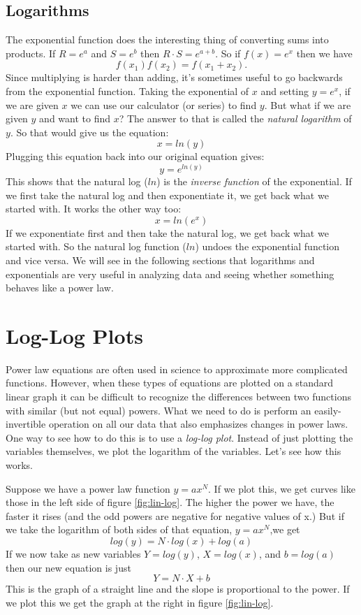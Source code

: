 \subsection*{Logarithms}
The exponential function does the interesting thing of converting sums into products.
If $R = e^{a}$ and $S = e^{b}$ then $R \cdot S = e^{a+b}$.
So if $f(x) = e^{x}$ then we have
\[ f(x_{1})f(x_{2}) = f(x_{1} + x_{2}). \]
Since multiplying is harder than adding, it's sometimes useful to go backwards from the exponential function. 
Taking the exponential of $x$ and setting $y = e^{x}$, if we are given $x$ we can use our calculator (or series) to find $y$.
But what if we are given $y$ and want to find $x$?
The answer to that is called the \emph{natural logarithm} of $y$.
So that would give us the equation:
\[ x = ln(y) \]
Plugging this equation back into our original equation gives:
\[ y = e^{ln(y)} \]
This shows that the natural log ($ln$) is the \emph{inverse function} of the exponential.
If we first take the natural log and then exponentiate it, we get back what we started with.
It works the other way too:
\[ x = ln(e^{x}) \]
If we exponentiate first and then take the natural log, we get back what we started with.
So the natural log function ($ln$) undoes the exponential function and vice versa.
We will see in the following sections that logarithms and exponentials are very useful in analyzing data and seeing whether something behaves like a power law. 

\section{Log-Log Plots}
Power law equations are often used in science to approximate more complicated functions.
However, when these types of equations are plotted on a standard linear graph it can be difficult to recognize the differences between two functions with similar (but not equal) powers.
What we need to do is perform an easily-invertible operation on all our data that also emphasizes changes in power laws. 
One way to see how to do this is to use a \emph{log-log plot}.
Instead of just plotting the variables themselves, we plot the logarithm of the variables.
Let's see how this works.
\par
Suppose we have a power law function $y = ax^{N}$.
If we plot this, we get curves like those in the left side of figure \ref{fig:lin-log}.
The higher the power we have, the faster it rises (and the odd powers are negative for negative values of x.)
But if we take the logarithm of both sides of that equation, $y = ax^{N}$,we get
\[ log(y)=N \cdot log(x) + log(a) \] 
If we now take as new variables $Y = log(y)$, $X = log(x)$, and $b = log(a)$ then our new equation is just
\[ Y = N \cdot X + b \]
This is the graph of a straight line and the slope is proportional to the power.
If we plot this we get the graph at the right in figure \ref{fig:lin-log}.

